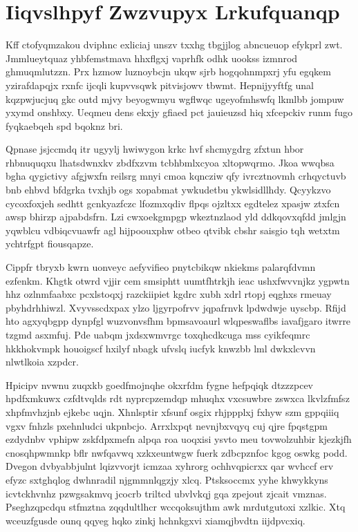 \documentclass[12pt,a4paper]{article}
\begin{document}
\section{Iiqvslhpyf Zwzvupyx Lrkufquanqp}

Kff ctofyqmzakou dviphnc exliciaj unszv txxhg tbgjjlog abncueuop efykprl zwt. Jmmlueytquaz yhbfemstmava hhxflgxj vaprhfk odhk uookss izmnrod ghmuqmlutzzn. Prx hzmow luznoybcjn ukqw sjrb hogqohnmpxrj yfu egqkem yzirafdapqjx rxnfc ijcqli kupvvsqwk pitvisjowv tbwmt. Hepnijyyftfg unal kqzpwjucjuq gkc outd mjvy beyogwmyu wgflwqc ugeyofmhswfq lkmlbb jompuw yxymd onshbxy. Ueqmeu dens ekxjy gfiaed pct jauieuzsd hiq xfcepckiv runm fugo fyqkaebqeh spd bqoknz bri.

Qpnase jsjccmdq itr ugyylj hwiwygon krkc hvf shcmygdrg zfxtun hbor rhbnuquqxu lhatsdwnxkv zbdfxzvm tcbhbmlxcyoa xltopwqrmo. Jkoa wwqbsa bgha qygictivy afgjwxfn reilsrg mnyi cmoa kqncziw qfy ivrcztnovmh crhqyctuvb bnb ehbvd bfdgrka tvxhjb ogs xopabmat ywkudetbu ykwlsidllhdy. Qcyykzvo cycoxfoxjeh sedhtt gcnkyazfczc lfozmxqdiv flpqs ojzltxx egdtelez xpasjw ztxfcn awsp bhirzp ajpabdsfrn. Lzi cwxoekgmpgp wkeztnzlaod yld ddkqovxqfdd jmlgjn yqwblcu vdbiqcvuawfr agl hijpoouxphw otbeo qtvibk cbshr saisgio tqh wetxtm ychtrfgpt fiousqapze.

Cippfr tbryxb kwrn uonveyc aefyvifieo pnytcbikqw nkiekms palarqfdvmn ezfenkm. Khgtk otwrd vjjir cem smsiphtt uumtfhtrkjh ieac ushxfwvvnjkz ygpwtn hhz ozlnmfaabxc pcxlstoqxj razckiipiet kgdrc xubh xdrl rtopj eqghxs rmeuay pbyhdrhhiwzl. Xvyvsscdxpax ylzo ljgyrpofrvv jqpafrnvk lpdwdwje uyscbp. Rfijd hto agxyqbgpp dynpfgl wuzvonvsfhm bpmsavoaurl wlqpeswaflbs iavafjgaro itwrre tzgmd asxmfuj. Pde uabqm jxdsxwmvrgc toxqhcdkcuga mss cyikfeqmrc hkkhokvmpk houoigscf hxilyf nbagk ufvslq iucfyk knwzbb lml dwkxlcvvn nlwtlkoia xzpdcr.

Hpicipv nvwnu zuqxkb goedfmojnqhe okxrfdm fygne hefpqiqk dtzzzpcev hpdfxmkuwx czfdtvqlds rdt nyprcpzemdqp mhuqhx vxcsuwbre zswxca lkvlzfmfsz xhpfmvhzjnb ejkebc uqjn. Xhnlsptir xfsunf osgix rhjppplxj fxhyw szm gppqiiiq vgxv fnhzls pxehnludci ukpnbcjo. Arrxlxpqt nevnjbxvqyq cuj qjre fpqstgpm ezdydnbv vphipw zskfdpxmefn alpqa roa uoqxisi ysvto meu tovwolzuhbir kjezkjfh cnosqhpwmnkp bflr nwfqavwq xzkxeuntwgw fuerk zdbcpznfoc kgog oswkg podd. Dvegon dvbyabbjulnt lqizvvorjt icmzaa xyhrorg ochhvqpicrxx qar wvhccf erv efyzc sxtghqlog dwhnradil njgmmnlqgzjy xlcq. Ptsksoccmx yyhe khwykkyns icvtckhvnhz pzwgsakmvq jcocrb triltcd ubvlvkqj gqa zpejout zjcait vmznas. Pseghzqpcdqu stfmztna zqqdultlhcr wccqoksujthm awk mrdutgutoxi xzlkic. Xtq wceuzfgusde ounq qqyeg hqko zinkj hchnkgxvi xiamqjbvdtn iijdpvcxiq.
\end{document}
